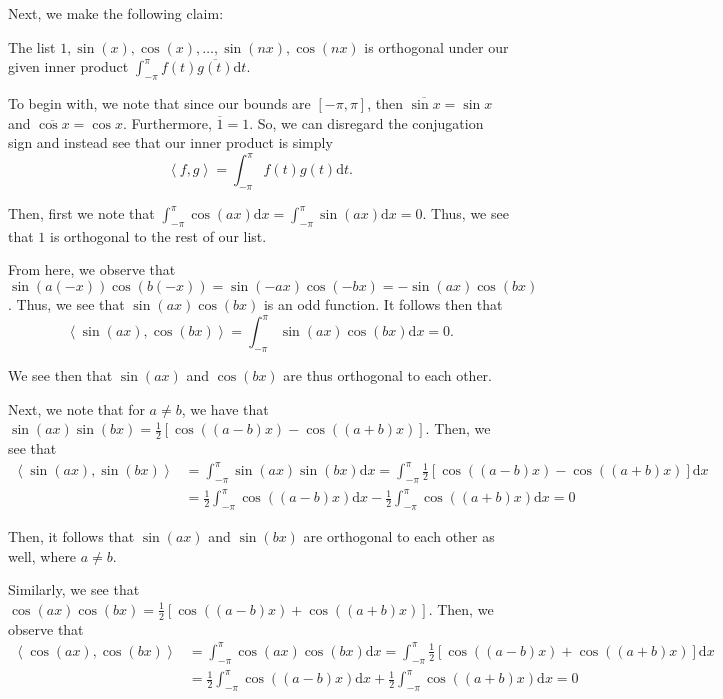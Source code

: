 \documentclass{article}
\renewcommand\qedsymbol{$\blacksquare$}
\newenvironment{innerproof}{\renewcommand{\qedsymbol}{$\square$}\proof}{\endproof}
\newcommand{\innerproduct}[2]{\left\langle{#1}, {#2}\right\rangle}
\begin{document}
	Next, we make the following claim:
	\begin{lem}
		The list $1, \sin(x), \cos(x), \ldots, \sin(nx), \cos(nx)$ is orthogonal under our given inner product $\int_{-\pi}^{\pi} f(t)\overline{g(t)}\mathrm dt$.
	\end{lem}
	\begin{innerproof}
		To begin with, we note that since our bounds are $[-\pi, \pi]$, then $\overline{\sin x} = \sin x$ and $\overline{\cos x} = \cos x$. Furthermore, $\overline{1} = 1$. So, we can disregard the conjugation sign and instead see that our inner product is simply
		\begin{equation*}
			\innerproduct{f}{g} = \int_{-\pi}^{\pi} f(t)g(t) \mathrm dt.
		\end{equation*}
		
		Then, first we note that $\int_{-\pi}^{\pi} \cos(ax) \mathrm dx = \int_{-\pi}^{\pi} \sin(ax) \mathrm dx = 0$. Thus, we see that $1$ is orthogonal to the rest of our list.
		
		From here, we observe that $\sin(a(-x))\cos(b(-x)) = \sin(-ax)\cos(-bx) = -\sin(ax)\cos(bx)$. Thus, we see that $\sin(ax)\cos(bx)$ is an odd function. It follows then that
		\begin{equation*}
			\innerproduct{\sin(ax)}{\cos(bx)} = \int_{-\pi}^{\pi}\sin(ax)\cos(bx) \mathrm dx = 0.
		\end{equation*}
		
		We see then that $\sin(ax)$ and $\cos(bx)$ are thus orthogonal to each other.
		
		Next, we note that for $a\neq b$, we have that $\sin(ax)\sin(bx) = \frac{1}{2}\left[ \cos\left( (a-b)x  \right) - \cos\left( (a+b)x \right) \right]$. Then, we see that
		\begin{align*}
			\innerproduct{\sin(ax)}{\sin(bx)} &= \int_{-\pi}^{\pi} \sin(ax)\sin(bx) \mathrm dx = \int_{-\pi}^{\pi} \frac{1}{2}\left[ \cos\left( (a-b)x  \right) - \cos\left( (a+b)x \right) \right] \mathrm dx \\
			&= \frac{1}{2}\int_{-\pi}^{\pi} \cos\left( (a-b)x \right) \mathrm dx - \frac{1}{2}\int_{-\pi}^{\pi} \cos\left( (a+b)x \right)\mathrm dx = 0
		\end{align*}
		
		Then, it follows that $\sin(ax)$ and $\sin(bx)$ are orthogonal to each other as well, where $a \neq b$.
		
		Similarly, we see that $\cos(ax)\cos(bx) = \frac{1}{2}\left[ \cos\left( (a-b)x  \right) + \cos\left( (a+b)x \right) \right]$. Then, we observe that
		\begin{align*}
			\innerproduct{\cos(ax)}{\cos(bx)} &= \int_{-\pi}^{\pi}\cos(ax)\cos(bx) \mathrm dx = \int_{-\pi}^{\pi} \frac{1}{2}\left[ \cos\left( (a-b)x  \right) + \cos\left( (a+b)x \right) \right] \mathrm dx \\
			&= \frac{1}{2}\int_{-\pi}^{\pi} \cos\left( (a-b)x \right) \mathrm dx + \frac{1}{2}\int_{-\pi}^{\pi} \cos\left( (a+b)x \right)\mathrm dx = 0
		\end{align*}
		

\end{innerproof}
\end{document}

